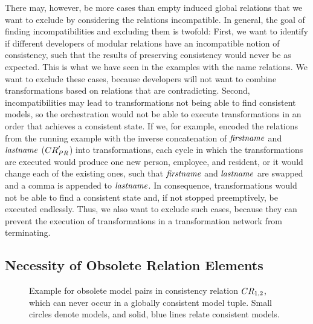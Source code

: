 There may, however, be more cases than empty induced global relations that we want to exclude by considering the relations incompatible.
In general, the goal of finding incompatibilities and excluding them is twofold:
First, we want to identify if different developers of modular relations have an incompatible notion of consistency, such that the results of preserving consistency would never be as expected.
This is what we have seen in the examples with the name relations.
We want to exclude these cases, because developers will not want to combine transformations based on relations that are contradicting.
Second, incompatibilities may lead to transformations not being able to find consistent models, so the orchestration would not be able to execute transformations in an order that achieves a consistent state.
If we, for example, encoded the relations from the running example with the inverse concatenation of $\mathit{firstname}$ and $\mathit{lastname}$ ($\consistencyrelation{CR}{PR}'$) into transformations, each cycle in which the transformations are executed would produce one new person, employee, and resident, or it would change each of the existing ones, such that $\mathit{firstname}$ and $\mathit{lastname}$ are swapped and a comma is appended to $\mathit{lastname}$.
In consequence, transformations would not be able to find a consistent state and, if not stopped preemptively, be executed endlessly.
Thus, we also want to exclude such cases, because they can prevent the execution of transformations in a transformation network from terminating.

\subsection{Necessity of Obsolete Relation Elements}

\begin{figure}
    \centering
    
    \caption[Example for obsolete elements in consistency relations]{Example for obsolete model pairs in consistency relation $\consistencyrelation{CR}{1,2}$, which can never occur in a globally consistent model tuple. Small circles denote models, and solid, blue lines relate consistent models.}
    \label{fig:compatibility:obsolete_relations}
\end{figure}

